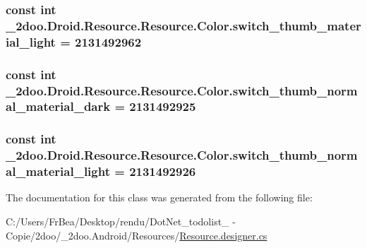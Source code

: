 \hypertarget{class__2doo_1_1_droid_1_1_resource_1_1_color_0d71930125652b68ae8c436e7522e58a}{
\subsubsection[{switch\_\-thumb\_\-material\_\-light}]{\setlength{\rightskip}{0pt plus 5cm}const int \_\-2doo.Droid.Resource.Resource.Color.switch\_\-thumb\_\-material\_\-light = 2131492962}}
\label{class__2doo_1_1_droid_1_1_resource_1_1_color_0d71930125652b68ae8c436e7522e58a}


\hypertarget{class__2doo_1_1_droid_1_1_resource_1_1_color_5b7f43b8b37f66fd667d19118b24fd19}{
\subsubsection[{switch\_\-thumb\_\-normal\_\-material\_\-dark}]{\setlength{\rightskip}{0pt plus 5cm}const int \_\-2doo.Droid.Resource.Resource.Color.switch\_\-thumb\_\-normal\_\-material\_\-dark = 2131492925}}
\label{class__2doo_1_1_droid_1_1_resource_1_1_color_5b7f43b8b37f66fd667d19118b24fd19}


\hypertarget{class__2doo_1_1_droid_1_1_resource_1_1_color_a85d7339bad58e47efd0f5a783d7c69a}{
\subsubsection[{switch\_\-thumb\_\-normal\_\-material\_\-light}]{\setlength{\rightskip}{0pt plus 5cm}const int \_\-2doo.Droid.Resource.Resource.Color.switch\_\-thumb\_\-normal\_\-material\_\-light = 2131492926}}
\label{class__2doo_1_1_droid_1_1_resource_1_1_color_a85d7339bad58e47efd0f5a783d7c69a}




The documentation for this class was generated from the following file:\begin{CompactItemize}
\item 
C:/Users/FrBea/Desktop/rendu/DotNet\_\-todolist\_ - Copie/2doo/\_\-2doo.Android/Resources/\hyperlink{_resource_8designer_8cs}{Resource.designer.cs}\end{CompactItemize}
